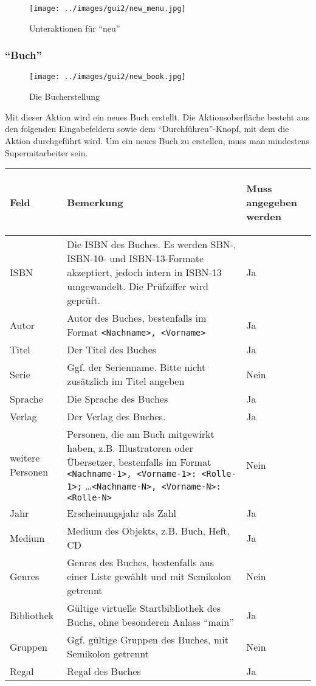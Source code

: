 \begin{figure}\texttt{[image: ../images/gui2/new\_menu.jpg]}\caption{Unteraktionen für ``neu''}\label{fig:new_menu}\end{figure}

\subsubsection{``Buch''}
\label{subsubsec:detail:new:book}
\begin{figure}\texttt{[image: ../images/gui2/new\_book.jpg]}\caption{Die Bucherstellung}\label{fig:new_book}\end{figure}

Mit dieser Aktion wird ein neues Buch erstellt. Die Aktionsoberfläche besteht aus den folgenden Eingabefeldern sowie dem ``Durchführen''-Knopf, mit dem die Aktion durchgeführt wird.
Um ein neues Buch zu erstellen, muss man mindestens Supermitarbeiter sein.

\begin{tabular}{|p{}|p{}|p{}|}\hline
\begin{center}Feld\end{center} & \begin{center}Bemerkung\end{center} & \begin{center}Muss angegeben werden\end{center}\\
\hline
ISBN & Die ISBN des Buches. Es werden SBN-, ISBN-10- und ISBN-13-Formate akzeptiert, jedoch intern in ISBN-13 umgewandelt. Die Prüfziffer wird geprüft. & Ja\\
\hline
Autor & Autor des Buches, bestenfalls im Format \verb=<Nachname>, <Vorname>= & Ja\\
\hline
Titel & Der Titel des Buches & Ja\\
\hline
Serie & Ggf. der Serienname. Bitte nicht zusätzlich im Titel angeben & Nein\\
\hline
Sprache & Die Sprache des Buches & Ja\\
\hline
Verlag & Der Verlag des Buches. & Ja\\
\hline
weitere Personen & Personen, die am Buch mitgewirkt haben, z.B. Illustratoren oder Übersetzer, bestenfalls im Format \verb=<Nachname-1>, <Vorname-1>: <Rolle-1>;= \ldots \verb=<Nachname-N>, <Vorname-N>: <Rolle-N>= & Nein\\
\hline
Jahr & Erscheinungsjahr als Zahl & Ja\\
\hline
Medium & Medium des Objekts, z.B. Buch, Heft, CD & Ja\\
\hline
Genres & Genres des Buches, bestenfalls aus einer Liste gewählt und mit Semikolon getrennt & Nein\\
\hline
Bibliothek & Gültige virtuelle Startbibliothek des Buchs, ohne besonderen Anlass ``main'' & Ja\\
\hline
Gruppen & Ggf. gültige Gruppen des Buches, mit Semikolon getrennt & Nein\\
\hline
Regal & Regal des Buches & Ja\\
\hline
\end{tabular}

